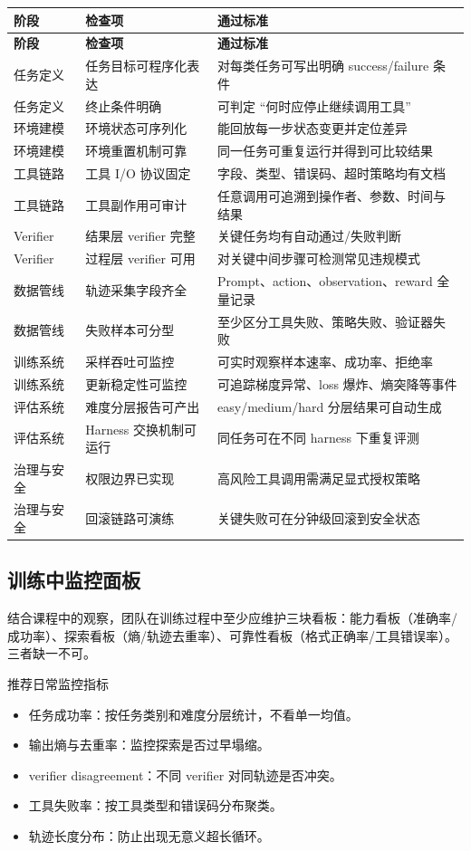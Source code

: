 \documentclass[a4paper]{article}
\begin{document}
\begin{longtable}{p{2.6cm}p{3.4cm}p{5.0cm}}
\toprule
\textbf{阶段} & \textbf{检查项} & \textbf{通过标准} \\
\midrule
\endfirsthead
\toprule
\textbf{阶段} & \textbf{检查项} & \textbf{通过标准} \\
\midrule
\endhead
任务定义 & 任务目标可程序化表达 & 对每类任务可写出明确 success/failure 条件 \\
任务定义 & 终止条件明确 & 可判定 ``何时应停止继续调用工具'' \\
环境建模 & 环境状态可序列化 & 能回放每一步状态变更并定位差异 \\
环境建模 & 环境重置机制可靠 & 同一任务可重复运行并得到可比较结果 \\
工具链路 & 工具 I/O 协议固定 & 字段、类型、错误码、超时策略均有文档 \\
工具链路 & 工具副作用可审计 & 任意调用可追溯到操作者、参数、时间与结果 \\
Verifier & 结果层 verifier 完整 & 关键任务均有自动通过/失败判断 \\
Verifier & 过程层 verifier 可用 & 对关键中间步骤可检测常见违规模式 \\
数据管线 & 轨迹采集字段齐全 & Prompt、action、observation、reward 全量记录 \\
数据管线 & 失败样本可分型 & 至少区分工具失败、策略失败、验证器失败 \\
训练系统 & 采样吞吐可监控 & 可实时观察样本速率、成功率、拒绝率 \\
训练系统 & 更新稳定性可监控 & 可追踪梯度异常、loss 爆炸、熵突降等事件 \\
评估系统 & 难度分层报告可产出 & easy/medium/hard 分层结果可自动生成 \\
评估系统 & Harness 交换机制可运行 & 同任务可在不同 harness 下重复评测 \\
治理与安全 & 权限边界已实现 & 高风险工具调用需满足显式授权策略 \\
治理与安全 & 回滚链路可演练 & 关键失败可在分钟级回滚到安全状态 \\
\bottomrule
\end{longtable}

\subsection{训练中监控面板}
结合课程中的观察，团队在训练过程中至少应维护三块看板：能力看板（准确率/成功率）、探索看板（熵/轨迹去重率）、可靠性看板（格式正确率/工具错误率）。三者缺一不可。

\begin{knowledgebox}{推荐日常监控指标}
\begin{itemize}
    \item 任务成功率：按任务类别和难度分层统计，不看单一均值。
    \item 输出熵与去重率：监控探索是否过早塌缩。
    \item verifier disagreement：不同 verifier 对同轨迹是否冲突。
    \item 工具失败率：按工具类型和错误码分布聚类。
    \item 轨迹长度分布：防止出现无意义超长循环。
\end{itemize}
\end{knowledgebox}
\end{document}
